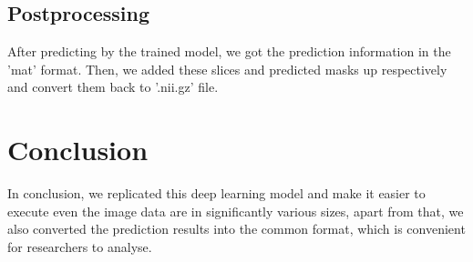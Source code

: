 \documentclass[10pt]{article}
\begin{document}
\subsection{Postprocessing}
After predicting by the trained model, we got the prediction information in the 'mat' format. Then, we added these slices and predicted masks up respectively and convert them back to '.nii.gz' file.

\section{Conclusion}
In conclusion, we replicated this deep learning model and make it easier to execute even the image data are in significantly various sizes, apart from that, we also converted the prediction results into the common format, which is convenient for researchers to analyse.






\end{document}
